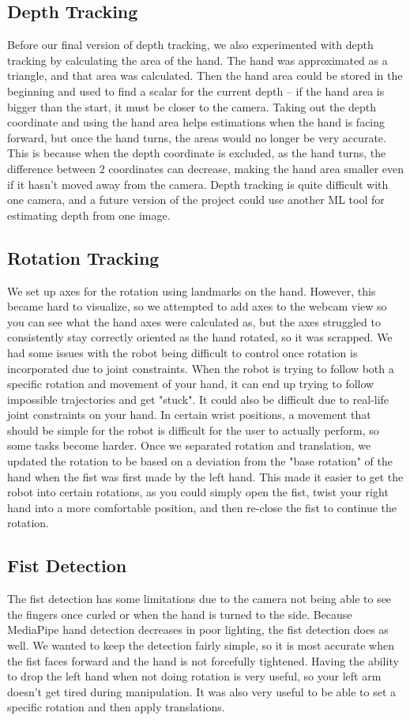 \documentclass{article}
\begin{document}
\subsection{Depth Tracking}
Before our final version of depth tracking, we also experimented with depth
tracking by calculating the area of the hand. The hand was approximated as a
triangle, and that area was calculated. Then the hand area could be stored in
the beginning and used to find a scalar for the current depth – if the hand
area is bigger than the start, it must be closer to the camera. Taking out the
depth coordinate and using the hand area helps estimations when the hand is
facing forward, but once the hand turns, the areas would no longer be very
accurate. This is because when the depth coordinate is excluded, as the hand
turns, the difference between 2 coordinates can decrease, making the hand area
smaller even if it hasn't moved away from the camera. Depth tracking is quite
difficult with one camera, and a future version of the project could use
another ML tool for estimating depth from one image. 

\subsection{Rotation Tracking}
We set up axes for the rotation using landmarks on the hand. However, this
became hard to visualize, so we attempted to add axes to the webcam view so you
can see what the hand axes were calculated as, but the axes struggled to
consistently stay correctly oriented as the hand rotated, so it was scrapped.
We had some issues with the robot being difficult to control once rotation is
incorporated due to joint constraints. When the robot is trying to follow both
a specific rotation and movement of your hand, it can end up trying to follow
impossible trajectories and get "stuck". It could also be difficult due to
real-life joint constraints on your hand. In certain wrist positions, a
movement that should be simple for the robot is difficult for the user to
actually perform, so some tasks become harder. Once we separated rotation and
translation, we updated the rotation to be based on a deviation from the "base
rotation" of the hand when the fist was first made by the left hand. This made
it easier to get the robot into certain rotations, as you could simply open the
fist, twist your right hand into a more comfortable position, and then re-close
the fist to continue the rotation.

\subsection{Fist Detection}
The fist detection has some limitations due to the camera not being able to see
the fingers once curled or when the hand is turned to the side. Because
MediaPipe hand detection decreases in poor lighting, the fist detection does as
well. We wanted to keep the detection fairly simple, so it is most accurate
when the fist faces forward and the hand is not forcefully tightened. Having
the ability to drop the left hand when not doing rotation is very useful, so
your left arm doesn't get tired during manipulation. It was also very useful to
be able to set a specific rotation and then apply translations.
\end{document}
